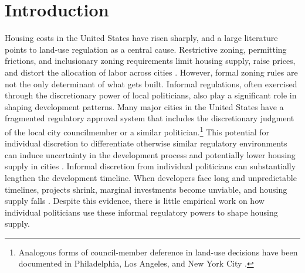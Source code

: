 
\section{Introduction}
\label{sec:intro}

Housing costs in the United States have risen sharply, and a large literature points to land-use regulation as a central cause.
Restrictive zoning, permitting frictions, and inclusionary zoning requirements limit housing supply, raise prices, and distort the allocation of labor across cities \citep{glaeser_why_2005, saiz_geographic_2010, turner_land_2014, hsieh_housing_2019, duranton_urban_2023, soltas_price_2024, soltas_how_2026}.
However, formal zoning rules are not the only determinant of what gets built.
Informal regulations, often exercised through the discretionary power of local politicians, also play a significant role in shaping development patterns.
Many major cities in the United States have a fragmented regulatory approval system that includes the discretionary judgment of the local city councilmember or a similar politician.\footnote{Analogous forms of council-member deference in land-use decisions have been documented in Philadelphia, Los Angeles, and New York City \citep{burnett_local_2014, jacobson_dysfunctional_2023, mitre-becerril_does_2024, new_york_city_charter_revision_commission_charter_2025}.}
This potential for individual discretion to differentiate otherwise similar regulatory environments can induce uncertainty in the development process and potentially lower housing supply in cities \citep{mayer_land_2000, hilber_origins_2013, khan_decentralized_2021, mast_warding_2024}.
Informal discretion from individual politicians can substantially lengthen the development timeline.
When developers face long and unpredictable timelines, projects shrink, marginal investments become unviable, and housing supply falls \citep{cunningham_house_2006, bloom_impact_2009, oh_land_2024}.
Despite this evidence, there is little empirical work on how individual politicians use these informal regulatory powers to shape housing supply.

